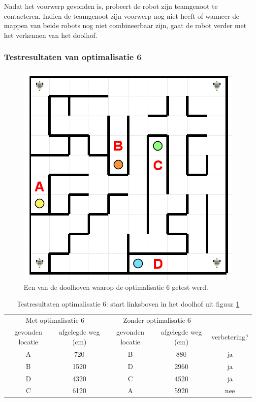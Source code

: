 \documentclass[tt3]{penoverslag}
\begin{document}
Nadat het voorwerp gevonden is, probeert de robot zijn teamgenoot te contacteren. Indien de teamgenoot zijn voorwerp nog niet heeft of wanneer de mappen van beide robots nog niet combineerbaar zijn, gaat de robot verder met het verkennen van het doolhof. \\

\subsubsection{Testresultaten van optimalisatie 6}
\label{ssec:AlgoZoekTest}

\begin{figure}[!hb]
\centering
	\includegraphics[scale=0.5]{doolhof3}
	\caption{Een van de doolhoven waarop de optimalisatie 6 getest werd.}
\label{fig:TestDead}
\end{figure}

\begin{table}[h]
\begin{center}
    \begin{tabular}{ c | c | c | c | c}
   \multicolumn{2}{c|}{Met optimalisatie 6} & \multicolumn{2}{|c|}{Zonder optimalisatie 6} & \\
     gevonden locatie & afgelegde weg (cm) & gevonden locatie &  afgelegde weg (cm) & verbetering?\\ \hline\hline
    A & 720 & B & 880 & ja \\ \hline
    B & 1520 & D & 2960 & ja \\ \hline
    D & 4320 & C & 4520 & ja\\ \hline
    C & 6120 & A & 5920 & nee\\
    \end{tabular}
    \caption{Testresultaten optimalisatie 6: start linksboven in het doolhof uit figuur \ref{fig:TestDead}}
    \label{tab:resultVerken1}
\end{center}
\end{table}
\end{document}
